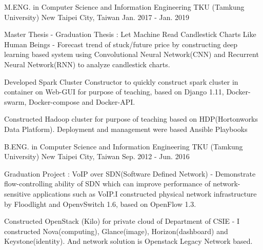 

\begin{cventries}

    \cventry
        {M.ENG. in Computer Science and Information Engineering}
        {TKU (Tamkung University)}
        {New Taipei City, Taiwan}
        {Jan. 2017 - Jan. 2019}
        {
            \begin{cvitems}
                \item 
                    {
                        Master Thesis - Graduation Thesis : Let Machine Read Candlestick Charts Like Human Beings - Forecast trend of stuck/future price by constructing deep learning based system using Convolutional Neural Network(CNN) and Recurrent Neural Network(RNN) to analyze candlestick charts.
                    }
                \item
                    {
                        Developed Spark Cluster Constructor to quickly construct spark cluster in container on Web-GUI for purpose of teaching, based on Django 1.11, Docker-swarm, Docker-compose and Docker-API.
                    }
                \item
                    {
                        Constructed Hadoop cluster for purpose of teaching based on HDP(Hortonworks Data Platform). Deployment and management were based Ansible Playbooks
                    }
            \end{cvitems}
        }

    \cventry
        {B.ENG. in Computer Science and Information Engineering}
        {TKU (Tamkung University)}
        {New Taipei City, Taiwan}
        {Sep. 2012 - Jun. 2016}
        {
            \begin{cvitems}
                \item 
                    {
                        Graduation Project : VoIP over SDN(Software Defined Network) - Demonstrate flow-controlling ability of SDN which can improve performance of network-sensitive applications such as VoIP.I constructed physical network infrastructure by Floodlight and OpenvSwitch 1.6, based on OpenFlow 1.3.
                    }
                \item
                    {
                        Constructed OpenStack (Kilo) for private cloud of Department of CSIE - I constructed Nova(computing), Glance(image), Horizon(dashboard) and Keystone(identity). And network solution is Openstack Legacy Network based.
                    }
            \end{cvitems}
        }
    


\end{cventries}
